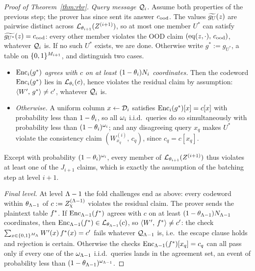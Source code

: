 \begin{proof}[Proof of Theorem~\ref{thm:rbr}]
\medskip\noindent\emph{Query message $\mathcal{Q}_i$.}
Assume both properties of the previous step; the prover has since sent its answer $c_{\mathrm{ood}}$. The values $\widetilde{g_U}(z)$ are pairwise distinct across $\mathcal{L}_{\theta_{i+1}}(Z^{(i+1)})$, so at most one member $U^\ast$ can satisfy $\widetilde{g_{U^\ast}}(z) = c_{\mathrm{ood}}$: every other member violates the OOD claim $(\operatorname{eq}(z, \cdot),\, c_{\mathrm{ood}})$, whatever $\mathcal{Q}_i$ is. If no such $U^\ast$ exists, we are done. Otherwise write $g^\ast := g_{U^\ast}$, a table on $\{0,1\}^{M_{i+1}}$, and distinguish two cases.
\begin{itemize}[itemsep=1pt]
\item \emph{$\mathrm{Enc}_i(g^\ast)$ agrees with $c$ on at least $(1 - \theta_i) N_i$ coordinates.} Then the codeword $\mathrm{Enc}_i(g^\ast)$ lies in $\mathcal{L}_{\theta_i}(c)$, hence violates the residual claim by assumption: $\langle W',\, g^\ast \rangle \neq c'$, whatever $\mathcal{Q}_i$ is.
\item \emph{Otherwise.} A uniform column $x \leftarrow \mathcal{D}_i$ satisfies $\mathrm{Enc}_i(g^\ast)[x] = c[x]$ with probability less than $1 - \theta_i$, so all $\omega_i$ i.i.d.\ queries do so simultaneously with probability less than $(1 - \theta_i)^{\omega_i}$; and any disagreeing query $x_q$ makes $U^\ast$ violate the consistency claim $(W^{(i)}_{x_q},\, c_q)$, since $c_q = c[x_q]$.
\end{itemize}
Except with probability $(1 - \theta_i)^{\omega_i}$, every member of $\mathcal{L}_{\theta_{i+1}}(Z^{(i+1)})$ thus violates at least one of the $J_{i+1}$ claims, which is exactly the assumption of the batching step at level $i + 1$.

\medskip\noindent\emph{Final level.}
At level $\Lambda - 1$ the fold challenges end as above: every codeword within $\theta_{\Lambda-1}$ of $c := Z^{(\Lambda-1)}_\chi$ violates the residual claim. The prover sends the plaintext table $f^{\ast}$. If $\mathrm{Enc}_{\Lambda-1}(f^{\ast})$ agrees with $c$ on at least $(1 - \theta_{\Lambda-1}) N_{\Lambda-1}$ coordinates, then $\mathrm{Enc}_{\Lambda-1}(f^{\ast}) \in \mathcal{L}_{\theta_{\Lambda-1}}(c)$, so $\langle W',\, f^{\ast} \rangle \neq c'$: the check $\sum_{x \in \{0,1\}^{M_\Lambda}} W'(x)\, f^{\ast}(x) = c'$ fails whatever $\mathcal{Q}_{\Lambda-1}$ is, i.e.\ the escape clause holds and rejection is certain. Otherwise the checks $\mathrm{Enc}_{\Lambda-1}(f^{\ast})[x_q] = c_q$ can all pass only if every one of the $\omega_{\Lambda-1}$ i.i.d.\ queries lands in the agreement set, an event of probability less than $(1 - \theta_{\Lambda-1})^{\omega_{\Lambda-1}}$.

\end{proof}


